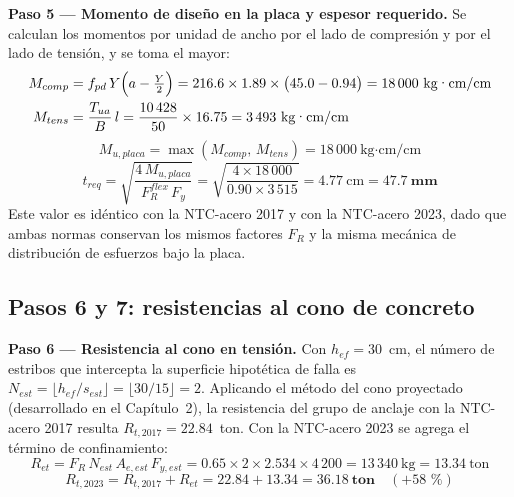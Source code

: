 \textbf{Paso 5 — Momento de diseño en la placa y espesor requerido.}
Se calculan los momentos por unidad de ancho por el lado de compresión y por el lado de tensión,
y se toma el mayor:
\begin{align*}
  M_{comp} &= f_{pd}\,Y\Bigl(a - \tfrac{Y}{2}\Bigr)
             = 216.6\times1.89\times\bigl(45.0 - 0.94\bigr)
             = 18\,000~\text{kg·cm/cm} \\
  M_{tens} &= \frac{T_{ua}}{B}\,l
             = \frac{10\,428}{50}\times16.75
             = 3\,493~\text{kg·cm/cm}
\end{align*}
\begin{equation*}
  M_{u,placa} = \max(M_{comp},\,M_{tens}) = 18\,000~\text{kg·cm/cm}
\end{equation*}
\begin{equation*}
  t_{req} = \sqrt{\frac{4\,M_{u,placa}}{F_R^{flex}\,F_y}}
          = \sqrt{\frac{4\times18\,000}{0.90\times3\,515}}
          = 4.77~\text{cm} = \mathbf{47.7~mm}
\end{equation*}
Este valor es idéntico con la NTC-acero 2017 y con la NTC-acero 2023, dado que ambas
normas conservan los mismos factores $F_R$ y la misma mecánica de distribución de
esfuerzos bajo la placa.

\subsection{Pasos 6 y 7: resistencias al cono de concreto}

\textbf{Paso 6 — Resistencia al cono en tensión.}
Con $h_{ef}=30$~cm, el número de estribos que intercepta la superficie hipotética de falla es
$N_{est} = \lfloor h_{ef}/s_{est}\rfloor = \lfloor 30/15\rfloor = 2$.
Aplicando el método del cono proyectado (desarrollado en el Capítulo~2), la resistencia del
grupo de anclaje con la NTC-acero 2017 resulta $R_{t,2017} = 22.84$~ton. Con la NTC-acero 2023
se agrega el término de confinamiento:
\begin{equation*}
  R_{et} = F_R\,N_{est}\,A_{e,est}\,F_{y,est}
         = 0.65\times2\times2.534\times4\,200
         = 13\,340~\text{kg} = 13.34~\text{ton}
\end{equation*}
\begin{equation*}
  R_{t,2023} = R_{t,2017} + R_{et} = 22.84 + 13.34 = \mathbf{36.18~\text{ton}}
  \quad (+58\text{ \%})
\end{equation*}

